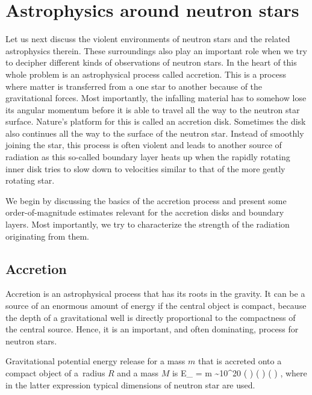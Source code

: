 \chapter{Astrophysics around neutron stars}

Let us next discuss the violent environments of neutron stars and the related astrophysics therein.
These surroundings also play an important role when we try to decipher different kinds of observations of neutron stars.
In the heart of this whole problem is an astrophysical process called accretion.
This is a process where matter is transferred from a one star to another because of the gravitational forces.
Most importantly, the infalling material has to somehow lose its angular momentum before it is able to travel all the way to the neutron star surface.
Nature's platform for this is called an accretion disk.
Sometimes the disk also continues all the way to the surface of the neutron star.
Instead of smoothly joining the star, this process is often violent and leads to another source of radiation as this so-called boundary layer heats up when the rapidly rotating inner disk tries to slow down to velocities similar to that of the more gently rotating star.

We begin by discussing the basics of the accretion process and present some order-of-magnitude estimates relevant for the accretion disks and boundary layers.
Most importantly, we try to characterize the strength of the radiation originating from them.


\section{Accretion}

Accretion is an astrophysical process that has its roots in the gravity. 
It can be a source of an enormous amount of energy if the central object is compact, because the depth of a gravitational well is directly proportional to the compactness of the central source.
Hence, it is an important, and often dominating, process for neutron stars.\cite[see e.g.,][]{FKR02}

Gravitational potential energy release for a mass $m$ that is accreted onto a compact object of a radius $R$ and a mass $M$ is
\be
\Delta E_{} = m  \sim 10^{20} \left(  \right) \left(  \right) \left(  \right) \erg,
\ee
where in the latter expression typical dimensions of neutron star are used.

